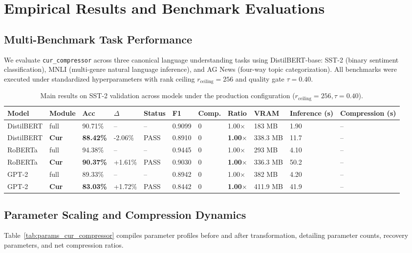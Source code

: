 \section{Empirical Results and Benchmark Evaluations}
\label{sec:results}

\subsection{Multi-Benchmark Task Performance}
We evaluate \texttt{cur\_compressor} across three canonical language understanding tasks using DistilBERT-base: SST-2 (binary sentiment classification), MNLI (multi-genre natural language inference), and AG News (four-way topic categorization). All benchmarks were executed under standardized hyperparameters with rank ceiling $r_{\mathrm{ceiling}} = 256$ and quality gate $\tau = 0.40$.

\begin{table}[t]
\centering
\small
\begin{tabular}{lllllllllll}
\toprule
\textbf{Model} & \textbf{Module} & \textbf{Acc} & \textbf{$\Delta$} & \textbf{Status} & \textbf{F1} & \textbf{Comp.} & \textbf{Ratio} & \textbf{VRAM} & \textbf{Inference (s)} & \textbf{Compression (s)} \\
\midrule
DistilBERT & full & 90.71\% & -- & -- & 0.9099 & 0 & 1.00$\times$ & 183 MB & 1.90 & -- \\
DistilBERT & \textbf{Cur} & \textbf{88.42\%} & -2.06\% & PASS & 0.8910 & 0 & \textbf{1.00$\times$} & 338.3 MB & 11.7 & -- \\
RoBERTa & full & 94.38\% & -- & -- & 0.9445 & 0 & 1.00$\times$ & 293 MB & 4.10 & -- \\
RoBERTa & \textbf{Cur} & \textbf{90.37\%} & +1.61\% & PASS & 0.9030 & 0 & \textbf{1.00$\times$} & 336.3 MB & 50.2 & -- \\
GPT-2 & full & 89.33\% & -- & -- & 0.8942 & 0 & 1.00$\times$ & 382 MB & 4.20 & -- \\
GPT-2 & \textbf{Cur} & \textbf{83.03\%} & +1.72\% & PASS & 0.8442 & 0 & \textbf{1.00$\times$} & 411.9 MB & 41.9 & -- \\
\bottomrule
\end{tabular}
\caption{Main results on SST-2 validation across models under the production configuration ($r_{\mathrm{ceiling}}=256, \tau=0.40$).}
\label{tab:main_sst2}
\end{table}

\subsection{Parameter Scaling and Compression Dynamics}
Table~\ref{tab:params_cur_compressor} compiles parameter profiles before and after transformation, detailing parameter counts, recovery parameters, and net compression ratios.

